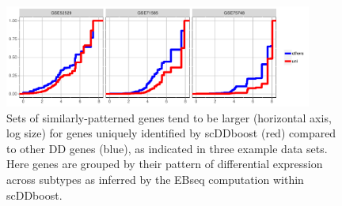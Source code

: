\documentclass[aoas,preprint]{imsart}
\begin{document}


\begin{figure}[H]
\includegraphics[width = 0.9\textwidth]{Figs/shift.pdf}
 \caption{Sets of similarly-patterned genes tend to be larger (horizontal axis, log size) for genes uniquely
 identified by scDDboost (red) compared to other DD genes (blue), as indicated in three example data sets.
 Here genes are grouped by their pattern of differential expression across subtypes as inferred by
the EBseq computation within scDDboost.}
  \label{fig:shift}
\end{figure}




\end{document}
